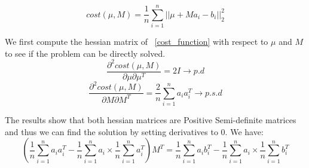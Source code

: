 \documentclass[runningheads]{llncs}
\begin{document}
\begin{enumerate}
\begin{equation}
\label{cost_function}
    cost(\mu, M) = \frac{1}{n}\sum_{i=1}^n||\mu + Ma_i - b_i||_2^2
\end{equation}

We first compute the hessian matrix of ~\ref{cost_function} with respect to $\mu$ and $M$ to see if the problem can be directly solved.
\begin{equation}
\label{hessian_1}
    \frac{\partial^2 cost(\mu, M)}{\partial \mu \partial \mu^T} = 2I \rightarrow p.d
\end{equation}
\begin{equation}
\label{hessian_2}
    \frac{\partial^2 cost(\mu, M)}{\partial M \partial M^T} = \frac{2}{n}\sum_{i=1}^na_ia_i^T \rightarrow p.s.d
\end{equation}

The results show that both hessian matrices are Positive Semi-definite matrices and thus we can find the solution by setting derivatives to 0. We have:
\begin{equation}
    (\frac{1}{n}\sum_{i=1}^na_ia_i^T - \frac{1}{n}\sum_{i=1}^na_i\times \frac{1}{n}\sum_{i=1}^na_i^T)M^T = \frac{1}{n}\sum_{i=1}^na_ib_i^T - \frac{1}{n}\sum_{i=1}^na_i\times \frac{1}{n}\sum_{i=1}^nb_i^T
\end{equation}





\end{enumerate}
\end{document}
